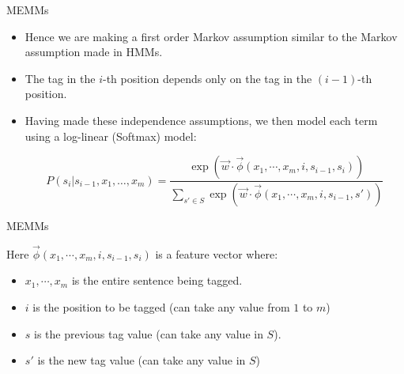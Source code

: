 \documentclass[handout]{beamer}
\begin{document}
\begin{frame}{MEMMs}
\begin{scriptsize}
\begin{itemize}
 \item Hence we are making a first order Markov assumption similar to the Markov assumption made in HMMs. 
 
 \item The tag in the $i$-th position depends only on the tag in the $(i -1)$-th position. 
 
 
 \item Having made these independence assumptions, we then model each term using a log-linear (Softmax) model:
 
 \begin{equation}
 P(s_i | s_{i-1}, x_1, \dots, x_m)  =  \frac{\exp (\vec{w}\cdot \vec{\phi}(x_1, \cdots, x_m, i, s_{i-1},s_i))}{\sum_{s' \in S} \exp (\vec{w}\cdot \vec{\phi}(x_1, \cdots, x_m, i, s_{i-1},s'))}
\end{equation}


 
\end{itemize}


\end{scriptsize}
\end{frame}



\begin{frame}{MEMMs}
\begin{scriptsize}

Here $\vec{\phi}(x_1, \cdots, x_m, i, s_{i-1},s_i)$ is a feature vector where:
\begin{itemize}
 \item $x_1, \cdots, x_m$ is the entire sentence being tagged.
  \item $i$ is the position to be tagged (can take any value from $1$ to $m$)
  \item $s$ is the previous tag value (can take any value in $S$).
  \item $s'$ is the new tag value (can take any value in $S$)
 
\end{itemize}


\end{scriptsize}
\end{frame}
\end{document}
